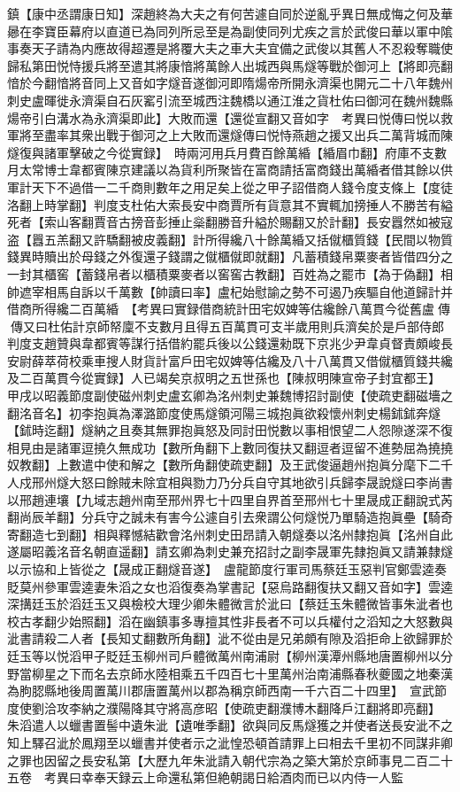 鎮【康中丞謂康日知】深趙終為大夫之有何苦遽自同於逆亂乎異日無成悔之何及華曏在李寶臣幕府以直道已為同列所忌至是為副使同列尤疾之言於武俊曰華以軍中隂事奏天子請為内應故得超遷是將覆大夫之車大夫宜備之武俊以其舊人不忍殺奪職使歸私第田悦恃援兵將至遣其將康愔將萬餘人出城西與馬燧等戰於御河上【將即亮翻愔於今翻愔將音同上又音如字燧音遂御河即隋煬帝所開永濟渠也開元二十八年魏州刺史盧暉徙永濟渠自石灰窰引流至城西注魏橋以通江淮之貨杜佑曰御河在魏州魏縣煬帝引白溝水為永濟渠即此】大敗而還【還從宣翻又音如字　考異曰悦傳曰悦以救軍將至盡率其衆出戰于御河之上大敗而還燧傳曰悦恃燕趙之援又出兵二萬背城而陳燧復與諸軍擊破之今從實録】　時兩河用兵月費百餘萬緍【緍眉巾翻】府庫不支數月太常博士韋都賓陳京建議以為貨利所聚皆在富商請括富商錢出萬緍者借其餘以供軍計天下不過借一二千商則數年之用足矣上從之甲子詔借商人錢令度支條上【度徒洛翻上時掌翻】判度支杜佑大索長安中商賈所有貨意其不實輒加搒捶人不勝苦有縊死者【索山客翻賈音古搒音彭捶止橤翻勝音升縊於賜翻又於計翻】長安囂然如被寇盗【囂五羔翻又許驕翻被皮義翻】計所得纔八十餘萬緍又括僦櫃質錢【民間以物質錢異時贖出於母錢之外復還子錢謂之僦櫃僦即就翻】凡蓄積錢帛粟麥者皆借四分之一封其櫃窖【蓄錢帛者以櫃積粟麥者以窖窖古教翻】百姓為之罷市【為于偽翻】相帥遮宰相馬自訴以千萬數【帥讀曰率】盧杞始慰諭之勢不可遏乃疾驅自他道歸計并借商所得纔二百萬緍　【考異曰實録借商統計田宅奴婢等估纔餘八萬貫今從舊盧傳傳又曰杜佑計京師帑廩不支數月且得五百萬貫可支半歲用則兵濟矣於是戶部侍郎判度支趙贊與韋都賓等謀行括借約罷兵後以公錢還勑既下京兆少尹韋貞督責頗峻長安尉薛萃荷校乘車搜人財貨計富戶田宅奴婢等估纔及八十八萬貫又借僦櫃質錢共纔及二百萬貫今從實録】人已竭矣京叔明之五世孫也【陳叔明陳宣帝子封宜都王】　甲戌以昭義節度副使磁州刺史盧玄卿為洺州刺史兼魏博招討副使【使疏吏翻磁墻之翻洺音名】初李抱眞為澤潞節度使馬燧領河陽三城抱眞欲殺懷州刺史楊鉥鉥奔燧【鉥時迄翻】燧納之且奏其無罪抱眞怒及同討田悦數以事相恨望二人怨隙遂深不復相見由是諸軍逗撓久無成功【數所角翻下上數同復扶又翻逗者逗留不進勢屈為撓撓奴教翻】上數遣中使和解之【數所角翻使疏吏翻】及王武俊逼趙州抱眞分麾下二千人戍邢州燧大怒曰餘賊未除宜相與勠力乃分兵自守其地欲引兵歸李晟說燧曰李尚書以邢趙連壤【九域志趙州南至邢州界七十四里自界首至邢州七十里晟成正翻說式芮翻尚辰羊翻】分兵守之誠未有害今公遽自引去衆謂公何燧悦乃單騎造抱眞壘【騎奇寄翻造七到翻】相與釋憾結歡會洺州刺史田昂請入朝燧奏以洺州隸抱眞【洺州自此遂屬昭義洺音名朝直遥翻】請玄卿為刺史兼充招討之副李晟軍先隸抱眞又請兼隸燧以示協和上皆從之【晟成正翻燧音遂】　盧龍節度行軍司馬蔡廷玉惡判官鄭雲逵奏貶莫州參軍雲逵妻朱滔之女也滔復奏為掌書記【惡烏路翻復扶又翻又音如字】雲逵深搆廷玉於滔廷玉又與檢校大理少卿朱體微言於泚曰【蔡廷玉朱體微皆事朱泚者也校古孝翻少始照翻】滔在幽鎮事多專擅其性非長者不可以兵權付之滔知之大怒數與泚書請殺二人者【長知丈翻數所角翻】泚不從由是兄弟頗有隙及滔拒命上欲歸罪於廷玉等以悦滔甲子貶廷玉柳州司戶體微萬州南浦尉【柳州漢潭州縣地唐置柳州以分野當柳星之下而名去京師水陸相乘五千四百七十里萬州治南浦縣春秋夔國之地秦漢為朐䏰縣地後周置萬川郡唐置萬州以郡為稱京師西南一千六百二十四里】　宣武節度使劉洽攻李納之濮陽降其守將高彦昭【使疏吏翻濮博木翻降戶江翻將即亮翻】　朱滔遣人以蠟書置髻中遺朱泚【遺唯季翻】欲與同反馬燧獲之并使者送長安泚不之知上驛召泚於鳳翔至以蠟書并使者示之泚惶恐頓首請罪上曰相去千里初不同謀非卿之罪也因留之長安私第【大歷九年朱泚請入朝代宗為之築大第於京師事見二百二十五卷　考異曰幸奉天録云上命還私第但絶朝謁日給酒肉而已以内侍一人監